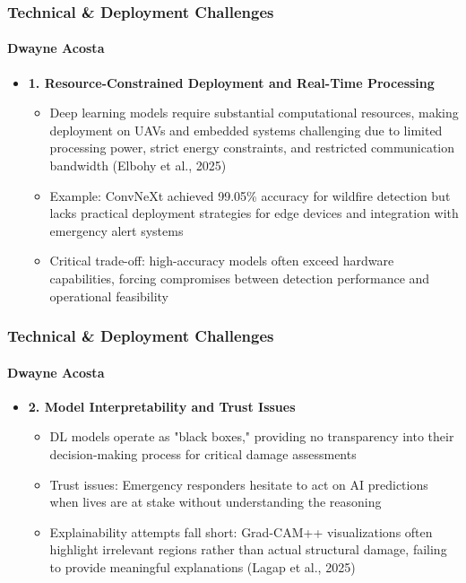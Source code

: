 \documentclass{beamer}
\newcommand{\namedframe}[3]{
  \begin{frame}
    \frametitle{#2}
    \framesubtitle{#1}
    #3
  \end{frame}
}
\begin{document}
\namedframe{Dwayne Acosta}{Technical \& Deployment Challenges}{
\begin{itemize}
    \item \textbf{1. Resource-Constrained Deployment and Real-Time Processing}
    \begin{itemize}
        \item Deep learning models require substantial computational resources, making deployment on UAVs and embedded systems challenging due to limited processing power, strict energy constraints, and restricted communication bandwidth (Elbohy et al., 2025)
        \item Example: ConvNeXt achieved 99.05\% accuracy for wildfire detection but lacks practical deployment strategies for edge devices and integration with emergency alert systems
        \item Critical trade-off: high-accuracy models often exceed hardware capabilities, forcing compromises between detection performance and operational feasibility
    \end{itemize}
\end{itemize}
}

\namedframe{Dwayne Acosta}{Technical \& Deployment Challenges}{
\begin{itemize}
    \item \textbf{2. Model Interpretability and Trust Issues}
    \begin{itemize}
        \item DL models operate as "black boxes," providing no transparency into their decision-making process for critical damage assessments
        \item Trust issues: Emergency responders hesitate to act on AI predictions when lives are at stake without understanding the reasoning
        \item Explainability attempts fall short: Grad-CAM++ visualizations often highlight irrelevant regions rather than actual structural damage, failing to provide meaningful explanations (Lagap et al., 2025)
    \end{itemize}
\end{itemize}
}
\end{document}
